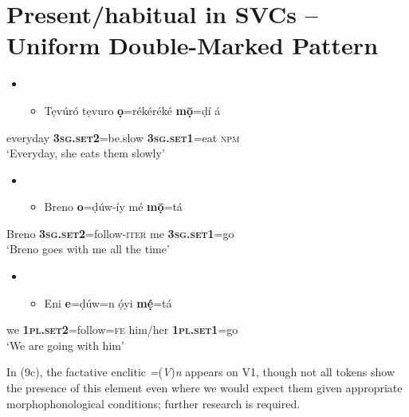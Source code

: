 \documentclass[output=paper]{langsci/langscibook}
\begin{document}
\chapter[Present/habitual in SVCs – Uniform Double{}-Marked Pattern]{Present/habitual in SVCs – Uniform Double-Marked Pattern}
\label{bkm:Ref453835454}\begin{itemize}
\item \setcounter{itemize}{0}
\begin{itemize}
\item \gll Tẹvúró tẹvuro  \textbf{ọ}=rékéréké       \textbf{m\={o}̣}=ḍí       á\\
\end{itemize}
\end{itemize}
       everyday     \textbf{\textsc{3sg.set2}}=be.slow  \textbf{\textsc{3sg.set1}}=eat  \textsc{npm}\\
\glt ‘Everyday, she eats them slowly’ 
\z

\begin{itemize}
\item \setcounter{itemize}{0}
\begin{itemize}
\item \gll Breno   \textbf{o}=ḍúw-íy         mé   \textbf{m\={o}̣}=tá\\
\end{itemize}
\end{itemize}
       Breno   \textbf{\textsc{3sg.set2}}=follow-\textsc{iter  }me   \textbf{3}\textbf{\textsc{sg.set1}}\textsc{=}go\\
\glt ‘Breno goes with me all the time’
\z

\begin{itemize}
\item \setcounter{itemize}{0}
\begin{itemize}
\item \gll Eni   \textbf{e}=ḍúw=n       ọ́yi       \textbf{mẹ́}=tá\\
\end{itemize}
\end{itemize}
       we   \textbf{\textsc{1pl.set2}}=follow=\textsc{fe}   him/her    \textbf{\textsc{1pl.set1}}=go\\
\glt ‘We are going with him’
\z

In (9c), the factative enclitic \textit{=}(\textit{V})\textit{n} appears on V1, though not all tokens show the presence of this element even where we would expect them given appropriate morphophonological conditions; further research is required. 
\end{document}
